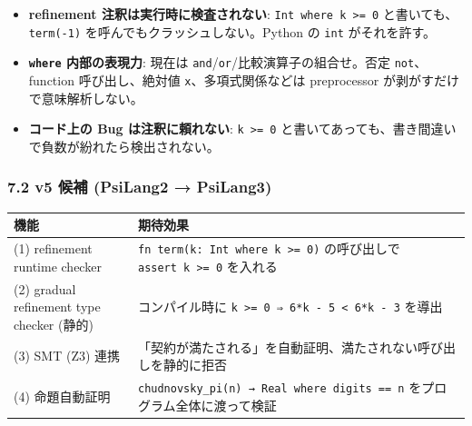\documentclass[
]{ltjsarticle}
\newcounter{none} %
\providecommand{\tightlist}{%
  \setlength{\itemsep}{0pt}\setlength{\parskip}{0pt}}
\begin{document}
\begin{itemize}
\tightlist
\item
  \textbf{refinement 注釈は実行時に検査されない}:
  \texttt{Int\ where\ k\ \textgreater{}=\ 0}
  と書いても、\texttt{term(-1)} を呼んでもクラッシュしない。Python の
  \texttt{int} がそれを許す。
\item
  \textbf{\texttt{where} 内部の表現力}: 現在は
  \texttt{and}/\texttt{or}/比較演算子の組合せ。否定
  \texttt{not}、function 呼び出し、絶対値
  \texttt{\textbar{}x\textbar{}}、多項式関係などは preprocessor
  が剥がすだけで意味解析しない。
\item
  \textbf{コード上の Bug は注釈に頼れない}:
  \texttt{k\ \textgreater{}=\ 0}
  と書いてあっても、書き間違いで負数が紛れたら検出されない。
\end{itemize}

\subsubsection{7.2 v5 候補 (PsiLang2 →
PsiLang3)}\label{v5-ux5019ux88dc-psilang2-psilang3}

{\def\LTcaptype{none} %
\begin{longtable}[]{@{}
  >{\raggedright\arraybackslash}p{}
  >{\raggedright\arraybackslash}p{}@{}}
\toprule\noalign{}
\begin{minipage}[b]{\linewidth}\raggedright
機能
\end{minipage} & \begin{minipage}[b]{\linewidth}\raggedright
期待効果
\end{minipage} \\
\midrule\noalign{}
\endhead
\bottomrule\noalign{}
\endlastfoot
(1) refinement runtime checker &
\texttt{fn\ term(k:\ Int\ where\ k\ \textgreater{}=\ 0)} の呼び出しで
\texttt{assert\ k\ \textgreater{}=\ 0} を入れる \\
(2) gradual refinement type checker (静的) & コンパイル時に
\texttt{k\ \textgreater{}=\ 0\ ⇒\ 6*k\ -\ 5\ \textless{}\ 6*k\ -\ 3}
を導出 \\
(3) SMT (Z3) 連携 &
「契約が満たされる」を自動証明、満たされない呼び出しを静的に拒否 \\
(4) 命題自動証明 &
\texttt{chudnovsky\_pi(n)\ →\ Real\ where\ digits\ ==\ n}
をプログラム全体に渡って検証 \\
\end{longtable}
}
\end{document}
